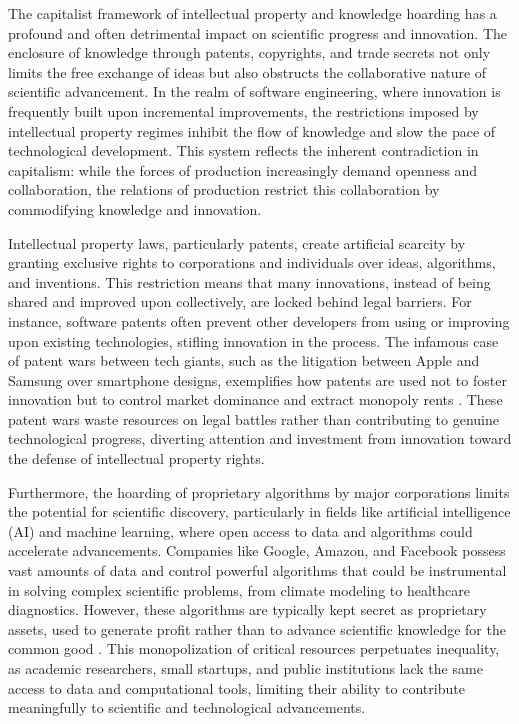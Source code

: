 \begin{refsection}
The capitalist framework of intellectual property and knowledge hoarding has a profound and often detrimental impact on scientific progress and innovation. The enclosure of knowledge through patents, copyrights, and trade secrets not only limits the free exchange of ideas but also obstructs the collaborative nature of scientific advancement. In the realm of software engineering, where innovation is frequently built upon incremental improvements, the restrictions imposed by intellectual property regimes inhibit the flow of knowledge and slow the pace of technological development. This system reflects the inherent contradiction in capitalism: while the forces of production increasingly demand openness and collaboration, the relations of production restrict this collaboration by commodifying knowledge and innovation.

Intellectual property laws, particularly patents, create artificial scarcity by granting exclusive rights to corporations and individuals over ideas, algorithms, and inventions. This restriction means that many innovations, instead of being shared and improved upon collectively, are locked behind legal barriers. For instance, software patents often prevent other developers from using or improving upon existing technologies, stifling innovation in the process. The infamous case of patent wars between tech giants, such as the litigation between Apple and Samsung over smartphone designs, exemplifies how patents are used not to foster innovation but to control market dominance and extract monopoly rents \cite[pp.~25-27]{bessen2014}. These patent wars waste resources on legal battles rather than contributing to genuine technological progress, diverting attention and investment from innovation toward the defense of intellectual property rights.

Furthermore, the hoarding of proprietary algorithms by major corporations limits the potential for scientific discovery, particularly in fields like artificial intelligence (AI) and machine learning, where open access to data and algorithms could accelerate advancements. Companies like Google, Amazon, and Facebook possess vast amounts of data and control powerful algorithms that could be instrumental in solving complex scientific problems, from climate modeling to healthcare diagnostics. However, these algorithms are typically kept secret as proprietary assets, used to generate profit rather than to advance scientific knowledge for the common good \cite[pp.~123-125]{pasquale2015}. This monopolization of critical resources perpetuates inequality, as academic researchers, small startups, and public institutions lack the same access to data and computational tools, limiting their ability to contribute meaningfully to scientific and technological advancements.


\end{refsection}
